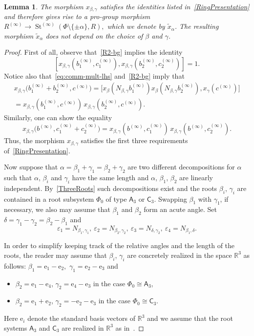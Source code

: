 \documentclass[oneside, 11pt]{amsart}
\numberwithin{equation}{section}
\newtheorem{lemma}{Lemma} \numberwithin{lemma}{section}
\theoremstyle{definition}
\theoremstyle{remark}
\DeclareMathOperator\St{St}
\newcommand{\rA}{\mathsf{A}}
\newcommand{\rC}{\mathsf{C}}
\begin{document}
\begin{lemma}\label{lem:new-root}
 The morphism $x_{\beta, \gamma}$ satisfies the identities listed in~\cref{RingPresentation} and therefore gives rise to a pro-group morphism $R^{(\infty)} \to \St^{(\infty)}(\Phi\setminus\{\pm\alpha\}, R),$ which we denote by $\widetilde{x}_\alpha$. The resulting morphism $\widetilde{x}_\alpha$ does not depend on the choice of $\beta$ and $\gamma$.
\end{lemma}
\begin{proof}
 First of all, observe that~\eqref{R2-bg} implies the identity \[[x_{\beta, \gamma}(b_1^{(\infty)}, c_1^{(\infty)}),
 x_{\beta, \gamma}(b_2^{(\infty)}, c_2^{(\infty)})] = 1.\] 
 Notice also that~\eqref{eq:comm-mult-lhs} and~\eqref{R2-bg} imply that
 \begin{align*}
 x_{\beta, \gamma}\bigl(b_1^{(\infty)} + b_2^{(\infty)}, c^{(\infty)}\bigr)
 = \bigl[x_\beta(N_{\beta, \gamma} b_1^{(\infty)})
 x_\beta(N_{\beta, \gamma} b_2^{(\infty)}),
 x_\gamma(c^{(\infty)})\bigr]\\
 = x_{\beta, \gamma}(b_1^{(\infty)}, c^{(\infty)})\,
 x_{\beta, \gamma}(b_2^{(\infty)}, c^{(\infty)}).
 \end{align*}
 Similarly, one can show the equality
 \[x_{\beta, \gamma}\bigl(b^{(\infty)}, c_1^{(\infty)} + c_2^{(\infty)}\bigr)
 = x_{\beta, \gamma}(b^{(\infty)}, c_1^{(\infty)})\,
 x_{\beta, \gamma}(b^{(\infty)}, c_2^{(\infty)}).\]
 Thus, the morphism \(x_{\beta, \gamma}\) satisfies the first three requirements of~\cref{RingPresentation}. 
 
 Now suppose that \(\alpha = \beta_1 + \gamma_1 = \beta_2 + \gamma_2\) are two different decompositions for $\alpha$ such that $\alpha$, $\beta_i$ and $\gamma_i$ have the same length and \(\alpha\), \(\beta_1\), \(\beta_2\) are linearly independent. By~\cref{ThreeRoots} such decompositions exist and the roots $\beta_i$, $\gamma_i$ are contained in a root subsystem $\Phi_0$ of type \(\rA_3\) or \(\rC_3\). Swapping $\beta_1$ with $\gamma_1$, if necessary, we also may assume that $\beta_1$ and $\beta_2$ form an acute angle. Set $\delta = \gamma_1 - \gamma_2 = \beta_2 - \beta_1$ and \[\varepsilon_1 = N_{\beta_1, \gamma_1},\ \varepsilon_2 = N_{\beta_2, \gamma_2},\ \varepsilon_3 = N_{\delta,\gamma_2},\ \varepsilon_4 = N_{\beta_1, \delta}.\]
 
In order to simplify keeping track of the relative angles and the length of the roots, the reader may assume that  $\beta_i$, $\gamma_i$ are concretely realized in the space $\mathbb{R}^3$ as follows:
\(\beta_1 = \mathrm e_1 - \mathrm e_2,\) \(\gamma_1 = \mathrm e_2 - \mathrm e_3\) and
 \begin{itemize}
 \item $\beta_2 = \mathrm e_1 - \mathrm e_4$, $\gamma_2 = \mathrm e_4 - \mathrm e_3$ in the case \(\Phi_0\cong\rA_3\), \item $\beta_2 = \mathrm e_1 + \mathrm e_2$, $\gamma_2 = -\mathrm e_2 - \mathrm e_3$ in the case \(\Phi_0\cong\rC_3\).
\end{itemize}
Here $\mathrm e_i$ denote the standard basis vectors of $\mathbb{R}^3$ and we assume that the root systems $\rA_3$ and $\rC_3$ are realized in $\mathbb{R}^3$ as in~\cite[Ch.~VI,~\S\S~4.6--4.7]{Bou81}. 


\end{proof}
\end{document}
